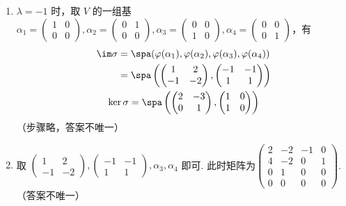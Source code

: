 \begin{enumerate}
\begin{enumerate}
              \item $ \lambda = -1 $ 时，取 $ V $ 的一组基 $ \alpha_1 = \begin{pmatrix} 1 & 0 \\ 0 & 0 \end{pmatrix}, \alpha_2 = \begin{pmatrix} 0 & 1 \\ 0 & 0 \end{pmatrix}, \alpha_3 = \begin{pmatrix} 0 & 0 \\ 1 & 0 \end{pmatrix}, \alpha_4 = \begin{pmatrix} 0 & 0 \\ 0 & 1 \end{pmatrix} $，有
                    \begin{gather*}
                        \begin{aligned}
                            \im \sigma & = \spa(\varphi(\alpha_1), \varphi(\alpha_2), \varphi(\alpha_3), \varphi(\alpha_4))                                \\
                                       & = \spa\left(\begin{pmatrix} 1 & 2 \\ -1 & -2 \end{pmatrix}, \begin{pmatrix} -1 & -1 \\ 1 & 1 \end{pmatrix}\right)
                        \end{aligned} \\
                        \ker \sigma = \spa\left(\begin{pmatrix} 2 & -3 \\ 0 & 1 \end{pmatrix}, \begin{pmatrix} 1 & 0 \\ 1 & 0 \end{pmatrix}\right)
                    \end{gather*}
                    （步骤略，答案不唯一）

              \item 取 $ \begin{pmatrix} 1 & 2 \\ -1 & -2 \end{pmatrix}, \begin{pmatrix} -1 & -1 \\ 1 & 1 \end{pmatrix}, \alpha_3, \alpha_4 $ 即可. 此时矩阵为$ \begin{pmatrix}
                            2 & -2 & -1 & 0 \\
                            4 & -2 & 0  & 1 \\
                            0 & 1  & 0  & 0 \\
                            0 & 0  & 0  & 0
                        \end{pmatrix} $. （答案不唯一）
          \end{enumerate}


\end{enumerate}
